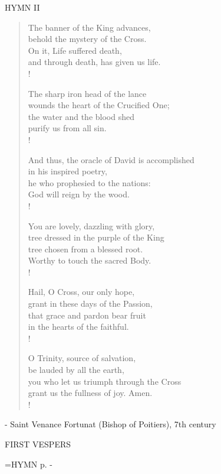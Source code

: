 \noindent\small{\uppercase{Hymn II}}\normalsize
\begin{verse}
The banner of the King advances,\\
behold the mystery of the Cross.\\
On it, Life suffered death,\\
and through death, has given us life.\\!

The sharp iron head of the lance\\
wounds the heart of the Crucified One;\\
the water and the blood shed\\
purify us from all sin.\\!

And thus, the oracle of David is accomplished\\
in his inspired poetry,\\
he who prophesied to the nations:\\
God will reign by the wood.\\!

You are lovely, dazzling with glory,\\
tree dressed in the purple of the King\\
tree chosen from a blessed root.\\
Worthy to touch the sacred Body.\\!

Hail, O Cross, our only hope,\\
grant in these days of the Passion,\\
that grace and pardon bear fruit\\
in the hearts of the faithful.\\!

O Trinity, source of salvation,\\
be lauded by all the earth,\\
you who let us triumph through the Cross\\
grant us the fullness of joy. Amen.\\!
\end{verse}

- Saint Venance Fortunat (Bishop of Poitiers), 7th century

\begin{flushleft}\normalsize FIRST VESPERS\\\end{flushleft}

\hangindent=\parindent \small{\uppercase{HYMN} p. \pageref{lent:firstHymn}-\pageref{lent:lastHymn}\\}

